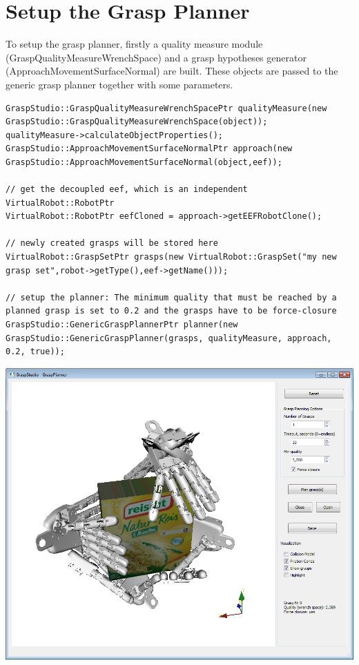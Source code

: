 \section{Setup the Grasp Planner}
To setup the grasp planner, firstly a quality measure module (GraspQualityMeasureWrenchSpace) and a grasp hypotheses generator (ApproachMovementSurfaceNormal) are built. These objects are passed to the generic grasp planner together with some parameters. 
\begin{lstlisting}
GraspStudio::GraspQualityMeasureWrenchSpacePtr qualityMeasure(new GraspStudio::GraspQualityMeasureWrenchSpace(object));
qualityMeasure->calculateObjectProperties();
GraspStudio::ApproachMovementSurfaceNormalPtr approach(new GraspStudio::ApproachMovementSurfaceNormal(object,eef));

// get the decoupled eef, which is an independent VirtualRobot::RobotPtr
VirtualRobot::RobotPtr eefCloned = approach->getEEFRobotClone();

// newly created grasps will be stored here 
VirtualRobot::GraspSetPtr grasps(new VirtualRobot::GraspSet("my new grasp set",robot->getType(),eef->getName()));

// setup the planner: The minimum quality that must be reached by a planned grasp is set to 0.2 and the grasps have to be force-closure
GraspStudio::GenericGraspPlannerPtr planner(new GraspStudio::GenericGraspPlanner(grasps, qualityMeasure, approach, 0.2, true));
\end{lstlisting}
\includegraphics[width=\textwidth]{GraspPlanner}
